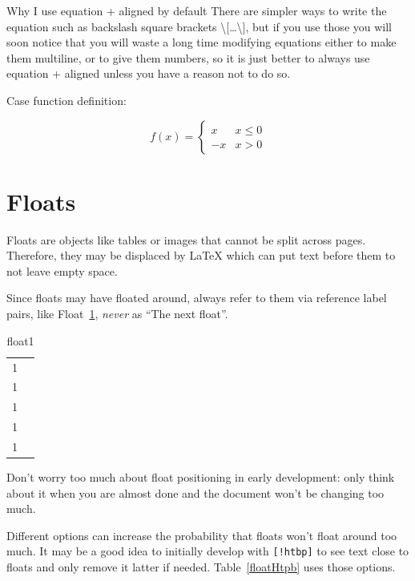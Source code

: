 \documentclass[12pt]{article}
\begin{document}
  \begin{remark}\label{remFor1} Why I use equation + aligned by default
    There are simpler ways to write the equation such as backslash square brackets \textbackslash{}[\ldots\textbackslash{}],
    but if you use those you will soon notice that you will waste a long time modifying equations
    either to make them multiline, or to give them numbers, so it is just better to always use
    equation + aligned unless you have a reason not to do so.
  \end{remark}

  Case function definition:

  \begin{equation}
    f(x) =
    \begin{cases}
      x & x \le 0 \\
      -x & x>0
    \end{cases}
  \end{equation}

\section{Floats}\label{floats}

  Floats are objects like tables or images that cannot be split across pages.
  Therefore, they may be displaced by LaTeX which can put text before them to
  not leave empty space.

  Since floats may have floated around, always refer to them via reference label pairs,
  like Float~\ref{float1}, \emph{never} as ``The next float''.

  \begin{table}
    \begin{tabular}{cc}
      1 \\ 1 \\ 1 \\ 1 \\ 1 \\
    \end{tabular}
    \caption{float1}
    \label{float1}
  \end{table}

  Don't worry too much about float positioning in early development: only think about
  it when you are almost done and the document won't be changing too much.

  Different options can increase the probability that floats won't float around too much.
  It may be a good idea to initially develop with \lstinline|[!htbp]| to see text close to floats
  and only remove it latter if needed. Table~\ref{floatHtpb} uses those options.
\end{document}
